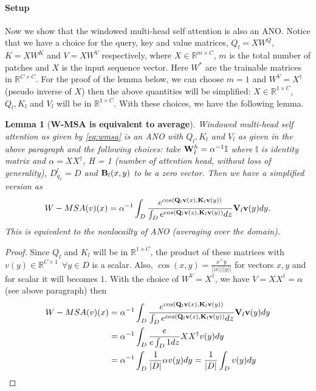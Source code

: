 \documentclass[reqno,10pt]{amsart}
\theoremstyle{plain}
\newtheorem{lem}{Lemma}
\theoremstyle{definition}
\newcommand{\bb}[1]{\mathbb{#1}}
\begin{document}
\paragraph{\bf Setup} \label{par:setup} Now we show that the windowed multi-head self attention is also an ANO. Notice that we have a choice for the query, key and value matrices, $Q_l = XW^Q$, $K = XW^K$ and $V = XW^V$ respectively, where $X \in \bb R^{m \times C}$, $m$ is the total number of patches and $X$ is the input sequence vector. Here $W^*$ are the trainable matrices in $\bb R^{C\times C}$. For the proof of the lemma below, we can choose $m = 1$ and $W^V = X^\dag$ (pseudo inverse of $X$) then the above quantities will be simplified: $X \in \bb R^{1\times C}$, $Q_l, K_l$ and $V_l$ will be in $\bb R^{1\times C}$. With these choices, we have the following lemma.
\begin{lem}[{\bf W-MSA is equivalent to average}]\label{lem:wmsa}
    Windowed multi-head self attention as given by \ref{eq:wmsa} is an ANO with $Q_l, K_l$ and $V_l$ as given in the above paragraph and the following choices: take ${\bf W}^h_l = \alpha^{-1}\bb I$ where $\bb I$ is identity matrix and $\alpha = XX^\dag$, H = 1 (number of attention head, without loss of generality), $D^l_{q_x} = D$ and ${\bf B}_l(x,y)$ to be a zero vector. Then we have a simplified version as
    $$W-MSA(v)(x) = \alpha^{-1}\int_{D} \frac{e^{cos({\bf Q}_l {\bf v}(x),{\bf K}_l {\bf v}(y))}}{\int_{D} e^{cos({\bf Q}_l {\bf v}(z),{\bf K}_l {\bf v}(y))}dz} {\bf V}_l {\bf v}(y) dy.$$
    This is equivalent to the nonlocailty of ANO (averaging over the domain).
\end{lem}
\begin{proof}
    Since $Q_l$ and $K_l$ will be in $\bb R^{1\times C}$, the product of these matrices with $v(y) \in \bb R^{C\times 1} ~~\forall y \in D$ is a scalar. Also, $\cos(x,y) = \frac{x^\top y}{||x|| ||y||}$ for vectors $x,y$ and for scalar it will becomes $1$. With the choice of $W^V = X^\dag$, we have $V = XX^\dag = \alpha$ (see above paragraph) then
    \begin{equation*}
        \begin{aligned}
            W-MSA(v)(x) &= \alpha^{-1}\int_{D} \frac{e^{cos({\bf Q}_l {\bf v}(x),{\bf K}_l {\bf v}(y))}}{\int_{D} e^{cos({\bf Q}_l {\bf v}(z),{\bf K}_l {\bf v}(y))}dz} {\bf V}_l {\bf v}(y) dy \\
            &= \alpha^{-1}\int_{D} \frac{e}{e\int_{D}1 dz} XX^\dag v(y) dy \\
            &= \alpha^{-1}\int_{D} \frac{1}{|D|} \alpha v(y) dy = \frac{1}{|D|}\int_{D} v(y) dy\\
        \end{aligned}
    \end{equation*}
\end{proof}
\end{document}
